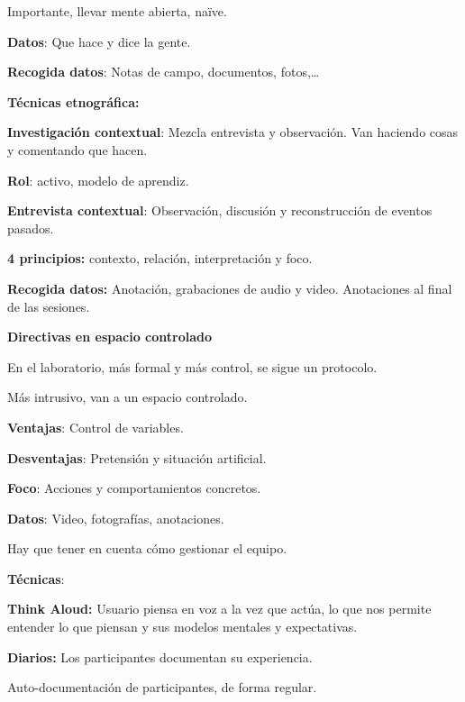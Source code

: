 \hspace{0pt} Importante, llevar mente abierta, naïve.

\hspace{0pt} \textbf{Datos}: Que hace y dice la gente.

\hspace{0pt} \textbf{Recogida datos}: Notas de campo, documentos,
fotos,\ldots{}

\textbf{Técnicas etnográfica:}

\hspace{0pt} \textbf{Investigación contextual}: Mezcla entrevista y
observación. Van haciendo cosas y comentando que hacen.

\hspace{0pt} \textbf{Rol}: activo, modelo de aprendiz.

\hspace{0pt} \textbf{Entrevista contextual}: Observación, discusión y
reconstrucción de eventos pasados.

\hspace{0pt} \textbf{4 principios:} contexto, relación, interpretación y
foco.

\hspace{0pt} \textbf{Recogida datos:} Anotación, grabaciones de audio y
video. Anotaciones al final de las sesiones.

\textbf{Directivas en espacio controlado}

En el laboratorio, más formal y más control, se sigue un protocolo.

Más intrusivo, van a un espacio controlado.

\textbf{Ventajas}: Control de variables.

\textbf{Desventajas}: Pretensión y situación artificial.

\textbf{Foco}: Acciones y comportamientos concretos.

\textbf{Datos}: Video, fotografías, anotaciones.

Hay que tener en cuenta cómo gestionar el equipo.

\textbf{Técnicas}:

\hspace{0pt} \textbf{Think Aloud:} Usuario piensa en voz a la vez que
actúa, lo que nos permite entender lo que piensan y sus modelos mentales
y expectativas.

\hspace{0pt} \textbf{Diarios:} Los participantes documentan su
experiencia.

\hspace{0pt} Auto-documentación de participantes, de forma regular.

